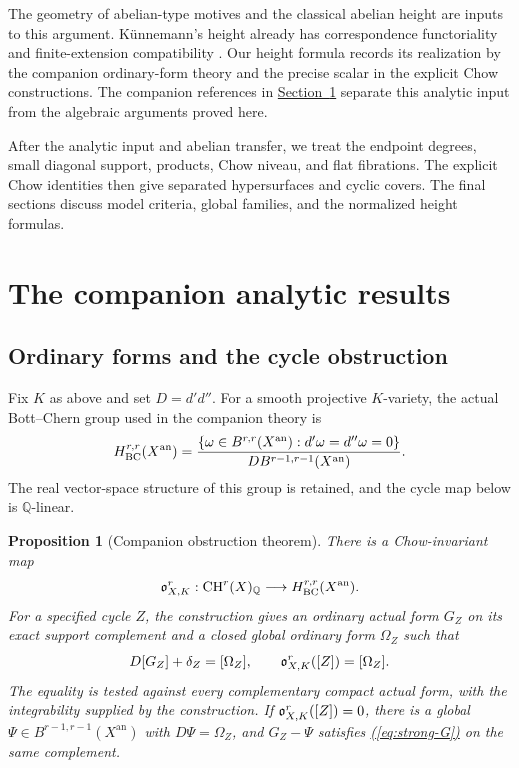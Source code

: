 \documentclass[11pt,a4paper]{article}
\newtheorem{proposition}[theorem]{Proposition}
\theoremstyle{definition}
\theoremstyle{remark}\newtheorem{remark}[theorem]{Remark}
\numberwithin{equation}{section}
\newcommand{\Q}{\mathbb Q}\newcommand{\R}{\mathbb R}\newcommand{\C}{\mathbb C}
\newcommand{\CH}{\operatorname{CH}}\newcommand{\an}{\mathrm{an}}
\newcommand{\secref}[1]{\hyperref[#1]{\textcolor{sectionlink}{Section~\ref*{#1}}}}
\renewcommand{\eqref}[1]{\hyperref[#1]{\textcolor{equationlink}{(\ref*{#1})}}}
\begin{document}
The geometry of abelian-type motives and the classical abelian height are
inputs to this argument. K\"unnemann's height already has correspondence
functoriality and finite-extension compatibility \cite[\S1]{Kun}. Our
height formula records its realization by the companion ordinary-form
theory and the precise scalar in the explicit Chow constructions.
The companion references in \secref{sec:analytic} separate this analytic
input from the algebraic arguments proved here.

After the analytic input and abelian transfer, we treat the endpoint
degrees, small diagonal support, products, Chow niveau, and flat
fibrations. The explicit Chow identities then give separated hypersurfaces
and cyclic covers. The final sections discuss model criteria, global
families, and the normalized height formulas.

\section{The companion analytic results}\label{sec:analytic}

\subsection{Ordinary forms and the cycle obstruction}\label{sub:obstruction}

Fix $K$ as above and set $D=d'd''$. For a smooth projective $K$-variety,
the actual Bott--Chern group used in the companion theory is
\begin{equation}\label{eq:BC}
 H_{\BC}^{r,r}(X^{\an})=
 \frac{\{\omega\in B^{r,r}(X^{\an}):d'\omega=d''\omega=0\}}
 {D B^{r-1,r-1}(X^{\an})}.
\end{equation}
The real vector-space structure of this group is retained, and the
cycle map below is $\Q$-linear.

\begin{proposition}[Companion obstruction theorem]\label{prop:obstruction}
There is a Chow-invariant map
\[
 \ob^r_{X,K}:\CH^r(X)_\Q\longrightarrow H_{\BC}^{r,r}(X^{\an}).
\]
For a specified cycle $Z$, the construction gives an ordinary actual
form $G_Z$ on its exact support complement and a closed global ordinary
form $\Omega_Z$ such that
\begin{equation}\label{eq:curved}
       D[G_Z]+\delta_Z=[\Omega_Z],
       \qquad \mathfrak o^r_{X,K}([Z])=[\Omega_Z].
\end{equation}
The equality is tested against every complementary compact actual form,
with the integrability supplied by the construction. If
$\mathfrak o^r_{X,K}([Z])=0$, there is a global
$\Psi\in B^{r-1,r-1}(X^{\an})$ with $D\Psi=\Omega_Z$, and
$G_Z-\Psi$ satisfies \eqref{eq:strong-G} on the same complement.
\end{proposition}
\end{document}
